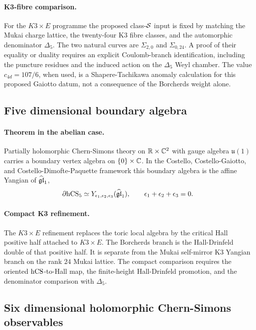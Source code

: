 \paragraph{K3-fibre comparison.}
For the \(K3\times E\) programme the proposed class-\(\mathcal{S}\) input is
fixed by matching the Mukai charge lattice, the twenty-four K3
fibre classes, and the automorphic denominator \(\Delta_5\).  The two
natural curves are \(\Sigma_{2,0}\) and \(\Sigma_{0,24}\).  A proof of
their equality or duality requires an explicit Coulomb-branch
identification, including the puncture residues and the induced action
on the \(\Delta_5\) Weyl chamber.  The value \(c_{4d}=107/6\), when
used, is a Shapere-Tachikawa anomaly calculation for this proposed
Gaiotto datum, not a consequence of the Borcherds weight alone.

\subsection*{Five dimensional boundary algebra}

\paragraph{Theorem in the abelian case.}
Partially holomorphic Chern-Simons theory on \(\mathbb{R}\times\mathbb{C}^2\) with
gauge algebra \(\mathfrak{u}(1)\) carries a boundary vertex algebra on
\(\{0\}\times\mathbb{C}\).  In the Costello, Costello-Gaiotto, and
Costello-Dimofte-Paquette framework this boundary algebra is the
affine Yangian of \(\widehat{\mathfrak{gl}}_1\),
\[
  \partial\mathrm{hCS}_5 \simeq
  Y_{\epsilon_1,\epsilon_2,\epsilon_3}(\widehat{\mathfrak{gl}}_1),\qquad
  \epsilon_1+\epsilon_2+\epsilon_3=0.
\]

\paragraph{Compact K3 refinement.}
The \(K3\times E\) refinement replaces the toric local algebra by the
critical Hall positive half attached to \(K3\times E\).  The Borcherds
branch is the Hall-Drinfeld double of that positive half.  It is
separate from the Mukai self-mirror K3 Yangian branch on the rank
\(24\) Mukai lattice.  The compact comparison requires the oriented
\(\mathrm{hCS}\)-to-Hall map, the finite-height Hall-Drinfeld promotion, and
the denominator comparison with \(\Delta_5\).

\subsection*{Six dimensional holomorphic Chern-Simons observables}

